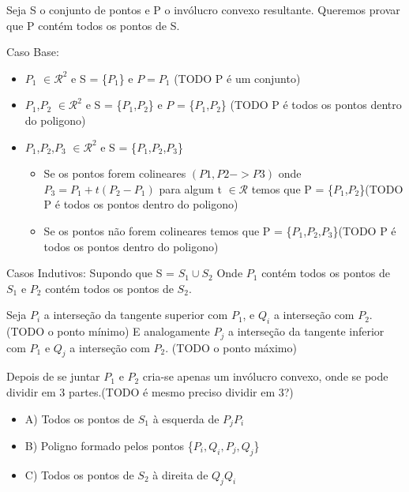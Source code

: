 \documentclass[11pt]{article}
\begin{document}
Seja S o conjunto de pontos e P o invólucro convexo resultante.
Queremos provar que P contém todos os pontos de S.

Caso Base:
\begin{itemize}
    \item $P_1$ $\in \mathcal{R}^2$ e S = \{$P_1$\} e $P = P_1$ (TODO P é um conjunto)
    \item $P_1$,$P_2$ $\in \mathcal{R}^2$ e S = \{$P_1$,$P_2$\} e $P$ = \{$P_1$,$P_2$\} (TODO P é todos os pontos dentro do poligono)
    \item $P_1$,$P_2$,$P_3$ $\in \mathcal{R}^2$ e S = \{$P_1$,$P_2$,$P_3$\} 
        \newline
        \begin{itemize}
            \item Se os pontos forem colineares $(P1,P2 -> P3)$ 
                \newline
                onde $P_3 = P_1 + t(P_2 - P_1)$ para algum t $\in \mathcal{R}$
                \newline
                 temos que P = \{$P_1$,$P_2$\}(TODO P é todos os pontos dentro do poligono)

            \item Se os pontos não forem colineares  
                \newline
                 temos que P = \{$P_1$,$P_2$,$P_3$\}(TODO P é todos os pontos dentro do poligono)
        \end{itemize}
\end{itemize}

Casos Indutivos:
\newline
Supondo que S = $S_1 \cup S_2$ 
\newline
Onde $P_1$ contém todos os pontos de $S_1$ e $P_2$ contém todos os pontos
de $S_2$.
\newline

Seja $P_i$ a interseção da tangente superior com $P_1$, e $Q_i$ a interseção 
com $P_2$.(TODO o ponto mínimo)
E analogamente $P_j$ a interseção da tangente inferior com $P_1$
e $Q_j$ a interseção com $P_2$. (TODO o ponto máximo)

Depois de se juntar $P_1$ e $P_2$ cria-se apenas um invólucro convexo,
onde se pode dividir em 3 partes.(TODO é mesmo preciso dividir em 3?)

\begin{itemize}
    \item A) Todos os pontos de $S_1$ à esquerda de $P_jP_i$
    \item B) Poligno formado pelos pontos \{$P_i,Q_i,P_j,Q_j$\}
    \item C) Todos os pontos de $S_2$ à direita de $Q_jQ_i$
\end{itemize}
\end{document}
